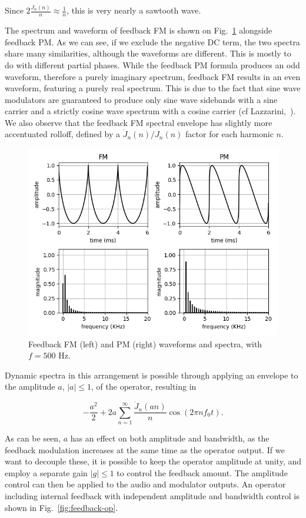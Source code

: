 \documentclass[]{interact}
\begin{document}
\noindent Since $2 \frac{J_{n}(n)} n \approx \frac 1 n$, this is very nearly a sawtooth wave.

The spectrum and waveform of feedback FM is shown on Fig.~\ref{fig:feedbackspec} 
alongside feedback PM. As we can see, if we exclude the negative DC term, 
the two spectra share many similarities, although the waveforms are different. This is mostly to do with different partial phases. While the feedback PM formula produces an odd waveform, therefore a purely imaginary spectrum, feedback FM results in an even waveform, featuring a purely real spectrum. This is due to the fact that sine wave modulators are guaranteed to produce only sine wave sidebands with a sine carrier and a strictly cosine wave spectrum with a cosine carrier (cf Lazzarini,~\citeyear[chap.8]{Lazzarini2021}). We also observe that the feedback FM spectral envelope has slightly more accentuated rolloff, defined
by a $\dot{J}_n(n)/J_{n}(n)$ factor for each harmonic $n$. 

\begin{figure}[htp]
\begin{center}
\includegraphics[width=.75\columnwidth]{feedback-sp.png}
\caption{Feedback FM (left) and PM (right) waveforms and spectra, with $f= 500$ Hz.}
\label{fig:feedbackspec}
\end{center}
\end{figure} 

Dynamic spectra in this arrangement is possible through applying an envelope to the amplitude $a$, $|a| \leq 1$, 
of the operator, resulting in

\begin{equation}
 -\frac {a^2} 2 + 2a \sum_{n=1}^{\infty} \frac{\dot{J}_n(an)} n  \cos(2\pi n f_0 t).
\end{equation}

\noindent As can be seen, $a$ has an effect on both amplitude and bandwidth, as the
feedback modulation increases at the same time as the operator output. If we want to decouple these,
it is possible to keep the operator amplitude at unity, and employ a separate gain $|g| \leq 1$  to 
control the feedback amount. The amplitude control can then be applied to the audio and modulator 
outputs. An operator including internal feedback with independent amplitude and bandwidth control is
shown in Fig.~\ref{fig:feedback-op}.
\end{document}
